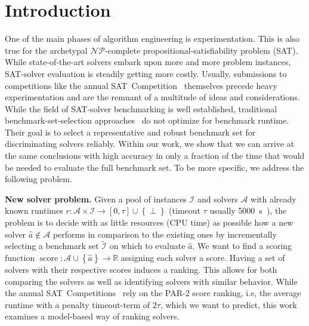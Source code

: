 \documentclass[runningheads]{llncs}
\begin{document}
\section{Introduction}
\label{sec:intro}
One of the main phases of algorithm engineering is experimentation.
This is al\-so true for the archetypal $\mathcal{NP}$-complete pro\-po\-si\-tio\-nal-sat\-is\-fia\-bi\-li\-ty problem (SAT).
While state-of-the-art solvers embark upon more and more problem instances, SAT-solver evaluation is steadily getting more costly.
Usually, submissions to competitions like the annual SAT~Competition~\cite{FroleyksHIJS21} themselves precede heavy experimentation and are the remnant of a multitude of ideas and considerations.
While the field of SAT-solver benchmarking is well established, traditional benchmark-set-selection approaches~\cite{Gelder11,HoosKSS13} do not optimize for benchmark runtime.
Their goal is to select a representative and robust benchmark set for discriminating solvers reliably.
Within our work, we show that we can arrive at the same conclusions with high accuracy in only a fraction of the time that would be needed to evaluate the full benchmark set.
To be more specific, we address the following problem.

\textbf{New solver problem.} Given a pool of instances $\mathcal{I}$ and solvers $\mathcal{A}$ with already known runtimes $r\!: \mathcal{A} \times \mathcal{I} \rightarrow \left[0, \tau\right] \cup \left\lbrace \perp \right\rbrace$ (timeout $\tau$ usually \SI{5000}{s}~\cite{FroleyksHIJS21}), the problem is to decide with as little resources (CPU time) as possible how a new solver $\hat{a} \notin \mathcal{A}$ performs in comparison to the existing ones by incrementally selecting a benchmark set $\tilde{\mathcal{I}}$ on which to evaluate $\hat{a}$.
We want to find a scoring function $\operatorname{score}\!: \mathcal{A} \cup \left\lbrace \hat{a} \right\rbrace \rightarrow \mathbb{R}$ assigning each solver a score.
Having a set of solvers with their respective scores induces a ranking.
This allows for both comparing the solvers as well as identifying solvers with similar behavior.
While the annual SAT~Competitions~\cite{FroleyksHIJS21} rely on the PAR-2 score ranking, i.e, the average runtime with a penalty timeout-term of $2\tau$, which we want to predict, this work examines a model-based way of ranking solvers.
\end{document}

